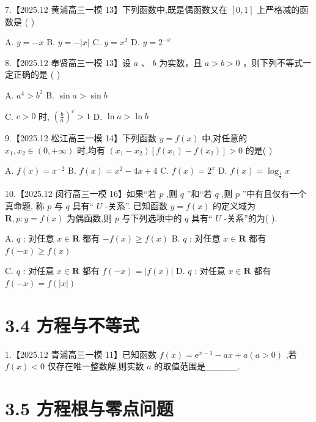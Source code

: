 \documentclass[10pt]{article}
\begin{document}
7.【2025.12 黄浦高三一模 13】下列函数中,既是偶函数又在 \(\left\lbrack  {0,1}\right\rbrack\) 上严格减的函数是 ( )

A. \(y =  - x\) B. \(y =  - \left| x\right|\) C. \(y = {x}^{2}\) D. \(y = {2}^{-x}\)

8.【2025.12 奉贤高三一模 13】设 \(a\text{ 、 }b\) 为实数，且 \(a > b > 0\) ，则下列不等式一定正确的是 ( )

A. \({a}^{4} > {b}^{2}\) B. \(\sin a > \sin b\)

C. \(c > 0\) 时, \({\left( \frac{b}{a}\right) }^{c} > 1\) D. \(\ln a > \ln b\)

9.【2025.12 松江高三一模 14】下列函数 \(y = f\left( x\right)\) 中,对任意的 \({x}_{1},{x}_{2} \in  \left( {0, + \infty }\right)\) 时,均有 \(\left( {{x}_{1} - {x}_{2}}\right) \left\lbrack  {f\left( {x}_{1}\right)  - f\left( {x}_{2}\right) }\right\rbrack   > 0\) 的是( )

A. \(f\left( x\right)  = {x}^{-2}\) B. \(f\left( x\right)  = {x}^{2} - {4x} + 4\) C. \(f\left( x\right)  = {2}^{x}\) D. \(f\left( x\right)  = {\log }_{\frac{1}{2}}x\)

10.【2025.12 闵行高三一模 16】如果“若 \(p\) ,则 \(q\) ”和“若 \(q\) ,则 \(p\) ”中有且仅有一个真命题, 称 \(p\) 与 \(q\) 具有“ \(U\) -关系”. 已知函数 \(y = f\left( x\right)\) 的定义域为 \(\mathbf{R},p : y = f\left( x\right)\) 为偶函数,则 \(p\) 与下列选项中的 \(q\) 具有“ \(U\) -关系”的为( ).

A. \(q\) : 对任意 \(x \in  \mathbf{R}\) 都有 \(- f\left( x\right)  \geq  f\left( x\right)\) B. \(q\) : 对任意 \(x \in  \mathbf{R}\) 都有 \(f\left( {-x}\right)  \geq  f\left( x\right)\)

C. \(q\) : 对任意 \(x \in  \mathbf{R}\) 都有 \(f\left( {-x}\right)  = \left| {f\left( x\right) }\right|\) D. \(q\) : 对任意 \(x \in  \mathbf{R}\) 都有 \(f\left( {-x}\right)  = f\left( \left| x\right| \right)\)

\section*{3.4 方程与不等式}

1.【2025.12 青浦高三一模 11】已知函数 \(f\left( x\right)  = {\mathrm{e}}^{x - 1} - {ax} + a\left( {a > 0}\right)\) ,若 \(f\left( x\right)  < 0\) 仅存在唯一整数解,则实数 \(a\) 的取值范围是\_\_\_\_\_.

\section*{3.5 方程根与零点问题}
\end{document}
